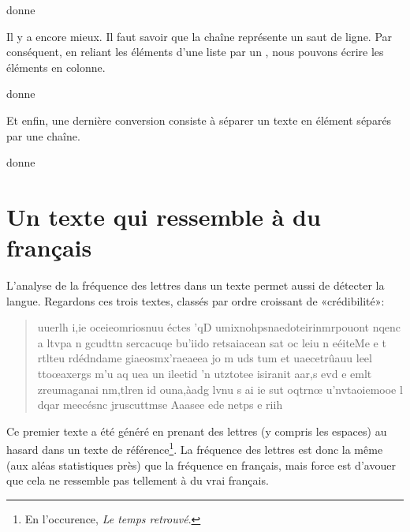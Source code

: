 

donne





Il y a encore mieux. Il faut savoir que la chaîne  représente un saut de ligne. Par conséquent, en reliant les éléments d'une liste par un , nous pouvons écrire les éléments en colonne. 



donne



Et enfin, une dernière conversion consiste à séparer un texte en élément séparés par une chaîne. 



donne





\section{Un texte qui ressemble à du français}

L'analyse de la fréquence des lettres dans un texte permet aussi de détecter la langue. Regardons ces trois textes, classés par ordre croissant de «crédibilité»:

\begin{quote}
    uuerlh i,ie oceieomriosnuu éctes 'qD umixnohpsnaedoteirinmrpouont nqenc a ltvpa n gcudttn  sercacuqe bu'iido retsaiacean sat oc leiu n  eéiteMe e   t  rtlteu rdédndame giaeosmx'raeaeea  jo m uds tum   et uaecetrûauu leel ttoœaxergs m'u aq uea un ileetid 'n utztotee isiranit aar,s evd e emlt zreumaganai nm,tlren id ouna,àadg lvnu s ai ie sut oqtrnœ u'nvtaoiemooe l  dqar meecésnc  jruscuttmse Aaasee ede netps  e riih
\end{quote}
Ce premier texte a été généré en prenant des lettres (y compris les espaces) au hasard dans un texte de référence\footnote{En l'occurence, \emph{Le temps retrouvé}.}. La fréquence des lettres est donc la même (aux aléas statistiques près) que la fréquence en français, mais force est d'avouer que cela ne ressemble pas tellement à du vrai français.
 
